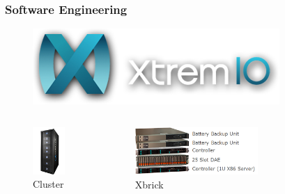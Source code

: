 \documentclass{beamer}
\theoremstyle{mystyle}
\begin{document}

\begin{frame}
\frametitle{Software Engineering}
\begin{figure}
	\begin{center}
		\includegraphics[scale=0.50]{xio_logo} 
	\end{center}
\end{figure}

\begin{columns}
		\vspace{-0.2in}
		\begin{figure}
			\includegraphics[scale=0.5]{xio.png}
			\caption{Cluster}
		\end{figure} 
		\pause
		\begin{figure}
		 	\includegraphics[scale=0.25]{xbrick.png}
		 	\caption{Xbrick}
		\end{figure}
		\pause
		\begin{figure}

\end{figure}
\end{columns}
\end{frame}
\end{document}
